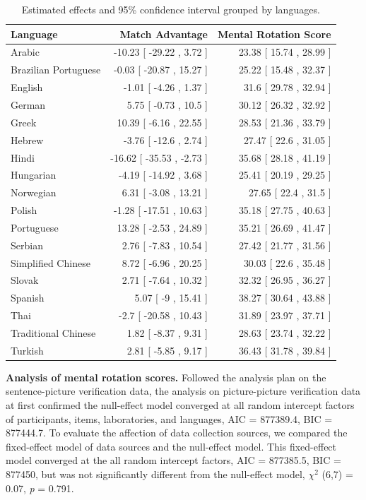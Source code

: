 \documentclass[
  man]{apa7}
\begin{document}
\begin{table}

\caption{\label{tab:lme-coef}Estimated effects and 95\% confidence interval grouped by languages.}
\centering
\begin{tabular}[t]{lrr}
\toprule
Language & Match Advantage & Mental Rotation Score\\
\midrule
Arabic & -10.23 [ -29.22 , 3.72 ] & 23.38 [ 15.74 , 28.99 ]\\
Brazilian Portuguese & -0.03 [ -20.87 , 15.27 ] & 25.22 [ 15.48 , 32.37 ]\\
English & -1.01 [ -4.26 , 1.37 ] & 31.6 [ 29.78 , 32.94 ]\\
German & 5.75 [ -0.73 , 10.5 ] & 30.12 [ 26.32 , 32.92 ]\\
Greek & 10.39 [ -6.16 , 22.55 ] & 28.53 [ 21.36 , 33.79 ]\\
\addlinespace
Hebrew & -3.76 [ -12.6 , 2.74 ] & 27.47 [ 22.6 , 31.05 ]\\
Hindi & -16.62 [ -35.53 , -2.73 ] & 35.68 [ 28.18 , 41.19 ]\\
Hungarian & -4.19 [ -14.92 , 3.68 ] & 25.41 [ 20.19 , 29.25 ]\\
Norwegian & 6.31 [ -3.08 , 13.21 ] & 27.65 [ 22.4 , 31.5 ]\\
Polish & -1.28 [ -17.51 , 10.63 ] & 35.18 [ 27.75 , 40.63 ]\\
\addlinespace
Portuguese & 13.28 [ -2.53 , 24.89 ] & 35.21 [ 26.69 , 41.47 ]\\
Serbian & 2.76 [ -7.83 , 10.54 ] & 27.42 [ 21.77 , 31.56 ]\\
Simplified Chinese & 8.72 [ -6.96 , 20.25 ] & 30.03 [ 22.6 , 35.48 ]\\
Slovak & 2.71 [ -7.64 , 10.32 ] & 32.32 [ 26.95 , 36.27 ]\\
Spanish & 5.07 [ -9 , 15.41 ] & 38.27 [ 30.64 , 43.88 ]\\
\addlinespace
Thai & -2.7 [ -20.58 , 10.43 ] & 31.89 [ 23.97 , 37.71 ]\\
Traditional Chinese & 1.82 [ -8.37 , 9.31 ] & 28.63 [ 23.74 , 32.22 ]\\
Turkish & 2.81 [ -5.85 , 9.17 ] & 36.43 [ 31.78 , 39.84 ]\\
\bottomrule
\end{tabular}
\end{table}

\textbf{Analysis of mental rotation scores.} Followed the analysis plan on the sentence-picture verification data, the analysis on picture-picture verification data at first confirmed the null-effect model converged at all random intercept factors of participants, items, laboratories, and languages, AIC = 877389.4, BIC = 877444.7. To evaluate the affection of data collection sources, we compared the fixed-effect model of data sources and the null-effect model. This fixed-effect model converged at the all random intercept factors, AIC = 877385.5, BIC = 877450, but was not significantly different from the null-effect model, \({\chi}^2\) (6,7) = 0.07, \emph{p} = 0.791.
\end{document}
